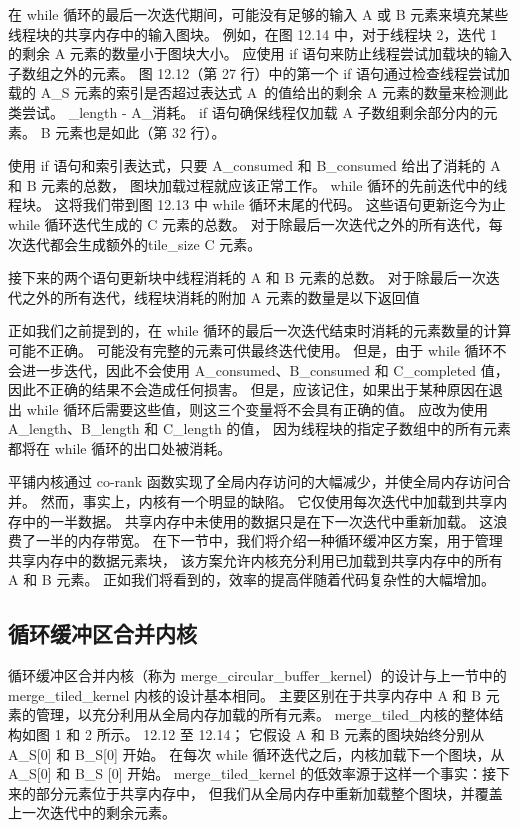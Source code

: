 在 while 循环的最后一次迭代期间，可能没有足够的输入 $\mathrm{A}$ 或 B 元素来填充某些线程块的共享内存中的输入图块。 
例如，在图 12.14 中，对于线程块 2，迭代 1 的剩余 A 元素的数量小于图块大小。 
应使用 if 语句来防止线程尝试加载块的输入子数组之外的元素。 
图 12.12（第 27 行）中的第一个 if 语句通过检查线程尝试加载的 A\_S 元素的索引是否超过表达式 A\ 的值给出的剩余 A 元素的数量来检测此类尝试。 \_length - A\_消耗。 if 语句确保线程仅加载 A 子数组剩余部分内的元素。 
B 元素也是如此（第 32 行）。

使用 if 语句和索引表达式，只要 A\_consumed 和 B\_consumed 给出了消耗的 $\mathrm{A}$ 和 $\mathrm{B}$ 元素的总数，
图块加载过程就应该正常工作。 while 循环的先前迭代中的线程块。 这将我们带到图 12.13 中 while 循环末尾的代码。 
这些语句更新迄今为止 while 循环迭代生成的 $\mathrm{C}$ 元素的总数。 
对于除最后一次迭代之外的所有迭代，每次迭代都会生成额外的tile\_size C 元素。

接下来的两个语句更新块中线程消耗的 A 和 B 元素的总数。 
对于除最后一次迭代之外的所有迭代，线程块消耗的附加 A 元素的数量是以下返回值


正如我们之前提到的，在 while 循环的最后一次迭代结束时消耗的元素数量的计算可能不正确。 
可能没有完整的元素可供最终迭代使用。 
但是，由于 while 循环不会进一步迭代，因此不会使用 A\_consumed、B\_consumed 和 C\_completed 值，
因此不正确的结果不会造成任何损害。 
但是，应该记住，如果出于某种原因在退出 while 循环后需要这些值，则这三个变量将不会具有正确的值。 
应改为使用 A\_length、B\_length 和 C\_length 的值，
因为线程块的指定子数组中的所有元素都将在 while 循环的出口处被消耗。

平铺内核通过 co-rank 函数实现了全局内存访问的大幅减少，并使全局内存访问合并。 
然而，事实上，内核有一个明显的缺陷。 它仅使用每次迭代中加载到共享内存中的一半数据。 
共享内存中未使用的数据只是在下一次迭代中重新加载。 这浪费了一半的内存带宽。 
在下一节中，我们将介绍一种循环缓冲区方案，用于管理共享内存中的数据元素块，
该方案允许内核充分利用已加载到共享内存中的所有 A 和 B 元素。 正如我们将看到的，效率的提高伴随着代码复杂性的大幅增加。

\subsection{循环缓冲区合并内核}
循环缓冲区合并内核（称为 merge\_circular\_buffer\_kernel）的设计与上一节中的 merge\_tiled\_kernel 内核的设计基本相同。 
主要区别在于共享内存中 $\mathrm{A}$ 和 $\mathrm{B}$ 元素的管理，以充分利用从全局内存加载的所有元素。 
merge\_tiled\_内核的整体结构如图 1 和 2 所示。 12.12 至 12.14； 
它假设 A 和 B 元素的图块始终分别从 A\_S[0] 和 B\_S[0] 开始。 
在每次 while 循环迭代之后，内核加载下一个图块，从 A\_S[0] 和 B\_S [0] 开始。 
merge\_tiled\_kernel 的低效率源于这样一个事实：接下来的部分元素位于共享内存中，
但我们从全局内存中重新加载整个图块，并覆盖上一次迭代中的剩余元素。

